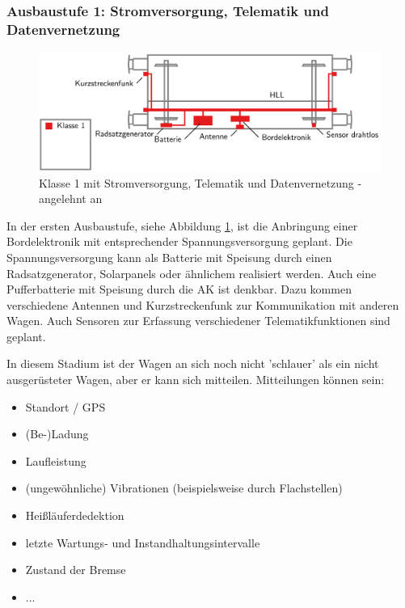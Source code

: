 \subsubsection{Ausbaustufe 1: Stromversorgung, Telematik und Datenvernetzung}
\begin{figure}[hbp] 
    \includegraphics[width=\textwidth]{Bilder/Ausbaustufen_1.PNG}
    \caption{Klasse 1 mit Stromversorgung, Telematik und Datenvernetzung - angelehnt an \cite{ETR_3} }
    \label{fig:Klasse1}
\end{figure} 
In der ersten Ausbaustufe, siehe Abbildung \ref{fig:Klasse1}, ist die Anbringung einer Bordelektronik mit  entsprechender Spannungsversorgung geplant. Die Spannungsversorgung kann als Batterie mit Speisung durch einen Radsatzgenerator, Solarpanels oder ähnlichem realisiert werden. Auch eine Pufferbatterie mit Speisung durch die AK ist denkbar. Dazu kommen verschiedene Antennen und Kurzstreckenfunk zur Kommunikation mit anderen Wagen. Auch Sensoren zur Erfassung verschiedener Telematikfunktionen sind geplant.\par
In diesem Stadium ist der Wagen an sich noch nicht 'schlauer' als ein nicht ausgerüsteter Wagen, aber er kann sich mitteilen. Mitteilungen können sein: 
\begin{itemize}
    \item Standort / GPS
    \item (Be-)Ladung
    \item Laufleistung
    \item (ungewöhnliche) Vibrationen (beispielsweise durch Flachstellen)
    \item Heißläuferdedektion
    \item letzte Wartungs- und Instandhaltungsintervalle
    \item Zustand der Bremse
    \item ...
\end{itemize}

